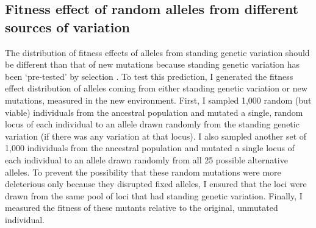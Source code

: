 \begin{doublespace}
\section{Fitness effect of random alleles from different sources of variation}




The distribution of fitness effects of alleles
from standing genetic variation should be different
than that of new mutations because standing genetic variation
has been `pre-tested' by selection \citep{bar08}.
%
To test this prediction,
I generated the fitness effect distribution
of alleles coming from either standing genetic variation
or new mutations, measured in the new environment.
%
First, I sampled 1,000 random (but viable)
individuals from the ancestral population
and mutated a single, random locus of each individual
to an allele drawn randomly from the standing genetic variation
(if there was any variation at that locus).
%
I also sampled another set of 1,000
individuals from the ancestral population
and mutated a single locus of each individual
to an allele drawn randomly from all 25 possible alternative alleles.
%
To prevent the possibility that these random mutations
were more deleterious only because they disrupted fixed alleles,
I ensured that the loci were drawn from the same pool
of loci that had standing genetic variation.
%
Finally, I measured the fitness of these mutants
relative to the original, unmutated individual.




\end{doublespace}
